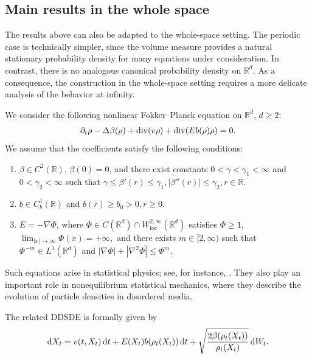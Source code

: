 \documentclass[UTF-8,reqno]{amsart}
\numberwithin{equation}{section}
\theoremstyle{definition}
\def\dif{{\mathord{{\rm d}}}}
\def\geq{\geqslant}
\def\leq{\leqslant}
\def\div{\mathord{{\rm div}}}
\def\dif{{\mathord{{\rm d}}}}
\def\geq{\geqslant}
\def\leq{\leqslant}
\def\div{\mathord{{\rm div}}}
\begin{document}
\subsection{Main results in the whole space}\label{sec:rcase}
The results above can also be adapted to the whole-space setting. The
periodic case is technically simpler, since the  volume measure
provides a natural stationary probability density for many equations under
consideration. In contrast, there is no analogous canonical probability
density on $\mathbb{R}^d$. As a consequence, the construction in the
whole-space setting requires a more delicate analysis of the behavior at
infinity.

We consider the following nonlinear Fokker--Planck equation on
$\mathbb{R}^d$, $d\geq 2$:
\begin{align}
\partial_t\rho
-
\Delta 
\beta(\rho)  
+
\div(v\rho)
+
\div(Eb(\rho)\rho)
=
0 .
\label{R:eq:fpe}
\end{align}
We assume that the coefficients satisfy the following conditions:
\begin{enumerate}
    \item[(a)] $\beta\in C^2(\mathbb{R})$, $\beta(0)=0$, and there exist
    constants $0<\gamma<\gamma_1<\infty$ and $0<\gamma_2<\infty$ such that
   $
    \gamma\leq \beta'(r)\leq \gamma_1,
    |\beta''(r)|\leq \gamma_2,
    r\in\mathbb{R}.
 $

    \item[(b)] $b\in C_b^1(\mathbb{R})$ and
   $
    b(r)\geq b_0>0,
    r\geq 0 .
   $

    \item[(c)] $E=-\nabla\Phi$, where
    $\Phi\in C(\mathbb{R}^d)\cap W^{2,\infty}_{\mathrm{loc}}(\mathbb{R}^d)$
    satisfies $\Phi\geq 1$,
    $
    \lim_{|x|\to\infty}\Phi(x)=+\infty,
     $
    and there exists $m\in[2,\infty)$ such that
    $\Phi^{-m}\in L^1(\mathbb{R}^d)$ and
    $
    |\nabla\Phi|+|\nabla^2\Phi|
    \leq
    \Phi^m .
    $
\end{enumerate}

Such equations arise in statistical physics; see, for instance,
\cite{Fra05,FD01,SNC07,Tsa09}. They also play an important role in
nonequilibrium statistical mechanics, where they describe the evolution of
particle densities in disordered media.

The related DDSDE is formally given by
\begin{align}
\dif X_t
=
v(t,X_t)\,\dif t
+
E(X_t)b(\rho_t(X_t))\,\dif t
+
\sqrt{\frac{2\beta(\rho_t(X_t))}{\rho_t(X_t)}}\,\dif W_t .
\label{R:eq:por}
\end{align} 
\end{document}
